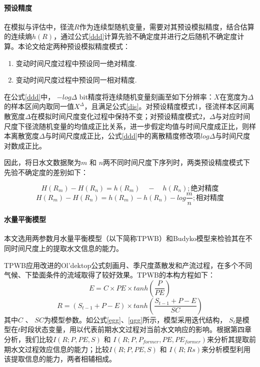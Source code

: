 \paragraph{预设精度}

在模拟与评估中，径流$R$作为连续型随机变量，需要对其预设模拟精度，结合估算的连续熵$h(R)$，通过公式\ref{ddd}计算先验不确定度并进行之后随机不确定度计算。本论文给定两种预设模拟精度模式：
\begin{enumerate}
\item 变动时间尺度过程中预设同一绝对精度.
\item 变动时间尺度过程中预设同一相对精度.
\end{enumerate}

在公式\ref{ddd}中， $-log\Delta$ bit精度将连续随机变量刻画至如下分辨率：$X$在宽度为$\Delta$的样本区间内取同一值$X^\Delta$，且满足公式\ref{dis}。对预设精度模式1，径流样本区间离散宽度$\Delta$在模拟时间尺度变化过程中保持不变；对预设精度模式2，$\Delta$与对应时间尺度下径流随机变量的均值成正比关系，进一步假定均值与时间尺度成正比，则样本离散宽度$\Delta$与时间尺度成正比，公式\ref{ddd}中的离散精度修改项$log \Delta$与时间尺度对数成正比。

因此，将日水文数据聚为$m$ 和 $n$两不同时间尺度下序列时，两类预设精度模式下先验不确定度的差别如下：

\begin{equation}
\label{cquantization}
H(R_m)-H(R_n)=h(R_m)\quad-\quad h(R_n) ;\text{绝对精度}
\end{equation}
\begin{equation}
\label{rquantization}
H(R_m)-H(R_n)=h(R_m)-h(R_n)-log\frac{m}{n} ;\text{相对精度} 
\end{equation}  

\paragraph{水量平衡模型}  
 
本文选用两参数月水量平衡模型\cite{xiong1999two}（以下简称TPWB）和Budyko模型来检验其在不同时间尺度上的提取水文信息的能力。

TPWB应用改进的Ol'dektop公式\cite{jobson1982evaporation}刻画月、季尺度蒸散发和产流过程，在多个不同气候、下垫面条件的流域取得了较好效果。TPWB的本构方程如下：
 \begin{equation}
 \label{egg}
E=C\times PE \times tanh(\frac{P}{PE})
 \end{equation}
 \begin{equation}
 \label{qgg}
R=(S_{t-1}+P-E)\times tanh(\frac{S_{t-1}+P-E}{SC})
\end{equation}
其中$C$ 、 $SC$为模型参数。如公式\ref{egg}、\ref{qgg}所示，模型采用迭代结构， $S_t$是模型在$t$时段状态变量，用以代表前期水文过程对当前水文响应的影响。根据第四章分析，我们比较$I(R;P,PE,S)$ 和 $I(R;P,P_{former},PE,PE_{former})$来分析其提取前期水文过程效应信息的能力；比较$I(R;P,PE,S)$ 和 $I(R;Rs)$来分析模型利用该提取信息的能力，两者相辅相成。

